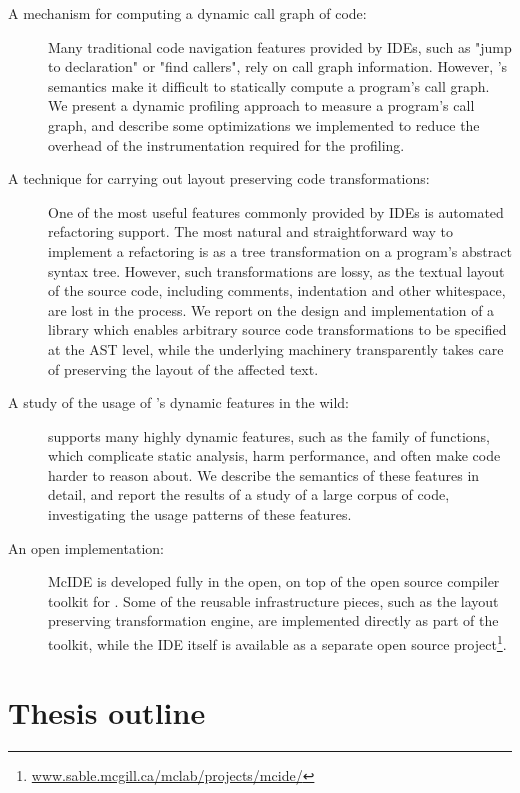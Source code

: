 \begin{description}

\item[A mechanism for computing a dynamic call graph of \matlab code:] Many
traditional code navigation features provided by IDEs, such as "jump to
declaration" or "find callers", rely on call graph information. However,
\matlab's semantics make it difficult to statically compute a program's call
graph. We present a dynamic profiling approach to measure a \matlab program's
call graph, and describe some optimizations we implemented to reduce the
overhead of the instrumentation required for the profiling.

\item[A technique for carrying out layout preserving code transformations:] One
of the most useful features commonly provided by IDEs is automated refactoring
support. The most natural and straightforward way to implement a refactoring is
as a tree transformation on a program's abstract syntax tree. However, such
transformations are lossy, as the textual layout of the source code, including
comments, indentation and other whitespace, are lost in the process. We report
on the design and implementation of a library which enables arbitrary source
code transformations to be specified at the AST level, while the underlying
machinery transparently takes care of preserving the layout of the affected
text.

\item[A study of the usage of \matlab's dynamic features in the wild:] \matlab
supports many highly dynamic features, such as the  family of
functions, which complicate static analysis, harm performance, and often make
code harder to reason about. We describe the semantics of these features in
detail, and report the results of a study of a large corpus of \matlab code,
investigating the usage patterns of these features.

\item[An open implementation:] McIDE is developed fully in the open, on top of
  the open source \mclab compiler toolkit for \matlab. Some of the reusable
  infrastructure pieces, such as the layout preserving transformation engine,
  are implemented directly as part of the toolkit, while the IDE itself is
  available as a separate open source
  project\footnote{\url{www.sable.mcgill.ca/mclab/projects/mcide/}}.

\end{description}

\section{Thesis outline}

